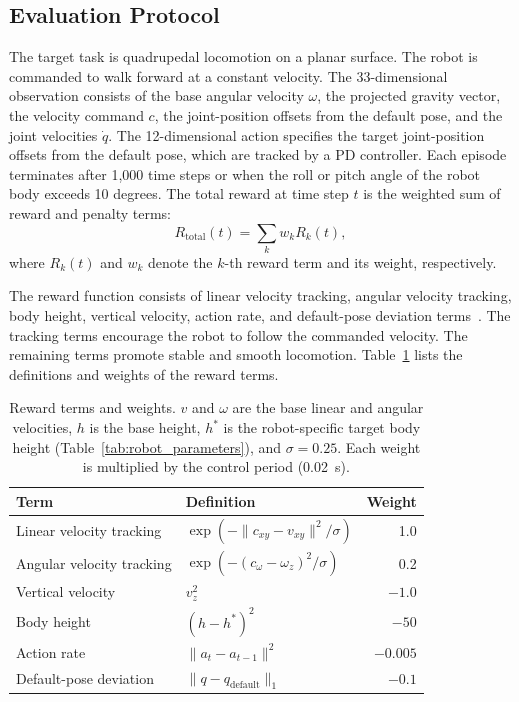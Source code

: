 \documentclass[runningheads]{llncs}
\begin{document}
\subsection{Evaluation Protocol}

The target task is quadrupedal locomotion on a planar surface. 
The robot is commanded to walk forward at a constant velocity.
The 33-dimensional observation consists of the base angular velocity $\omega$, the projected gravity vector, the velocity command $c$, the joint-position offsets from the default pose, and the joint velocities $\dot{q}$.
The 12-dimensional action specifies the target joint-position offsets from the default pose, which are tracked by a PD controller.
Each episode terminates after 1,000 time steps or when the roll or pitch angle of the robot body exceeds 10 degrees. 
The total reward at time step $t$ is the weighted sum of reward and penalty terms:
\begin{equation}
R_{\text{total}}(t) = \sum_{k} w_k R_k(t),
\end{equation}
where $R_k(t)$ and $w_k$ denote the $k$-th reward term and its weight, respectively.

The reward function consists of linear velocity tracking, angular velocity tracking, body height, vertical velocity, action rate, and default-pose deviation terms~\cite{Genesis}. 
The tracking terms encourage the robot to follow the commanded velocity.
The remaining terms promote stable and smooth locomotion.
Table~\ref{tab:reward} lists the definitions and weights of the reward terms.

\begin{table}[t]
  \centering
  \caption{Reward terms and weights. $v$ and $\omega$ are the base linear and angular velocities, $h$ is the base height, $h^{\ast}$ is the robot-specific target body height (Table~\ref{tab:robot_parameters}), and $\sigma = 0.25$. Each weight is multiplied by the control period (0.02~s).}
  \label{tab:reward}
  \begin{tabular}{llr}
    \toprule
    \textbf{Term} & \textbf{Definition} & \textbf{Weight} \\
    \midrule
    Linear velocity tracking & $\exp(-\|c_{xy} - v_{xy}\|^2/\sigma)$ & 1.0 \\
    Angular velocity tracking & $\exp(-(c_{\omega} - \omega_z)^2/\sigma)$ & 0.2 \\
    Vertical velocity & $v_z^2$ & $-1.0$ \\
    Body height & $(h - h^{\ast})^2$ & $-50$ \\
    Action rate & $\|a_t - a_{t-1}\|^2$ & $-0.005$ \\
    Default-pose deviation & $\|q - q_{\mathrm{default}}\|_1$ & $-0.1$ \\
    \bottomrule
  \end{tabular}
\end{table}
\end{document}
